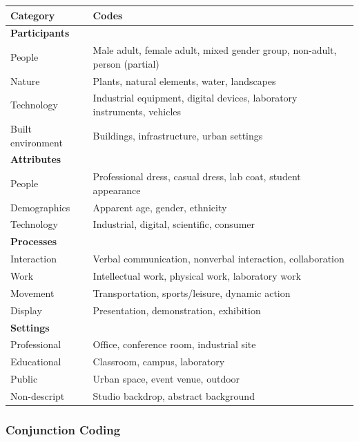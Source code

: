 \documentclass[../main.tex]{subfiles}
\begin{document}
\begin{center}
\small
\begin{tabular}{lp{8cm}}
\toprule
\textbf{Category} & \textbf{Codes} \\
\midrule
\textbf{Participants} & \\
\quad People & Male adult, female adult, mixed gender group, non-adult, person (partial) \\
\quad Nature & Plants, natural elements, water, landscapes \\
\quad Technology & Industrial equipment, digital devices, laboratory instruments, vehicles \\
\quad Built environment & Buildings, infrastructure, urban settings \\
\midrule
\textbf{Attributes} & \\
\quad People & Professional dress, casual dress, lab coat, student appearance \\
\quad Demographics & Apparent age, gender, ethnicity \\
\quad Technology & Industrial, digital, scientific, consumer \\
\midrule
\textbf{Processes} & \\
\quad Interaction & Verbal communication, nonverbal interaction, collaboration \\
\quad Work & Intellectual work, physical work, laboratory work \\
\quad Movement & Transportation, sports/leisure, dynamic action \\
\quad Display & Presentation, demonstration, exhibition \\
\midrule
\textbf{Settings} & \\
\quad Professional & Office, conference room, industrial site \\
\quad Educational & Classroom, campus, laboratory \\
\quad Public & Urban space, event venue, outdoor \\
\quad Non-descript & Studio backdrop, abstract background \\
\bottomrule
\end{tabular}
\end{center}

\subsubsection{Conjunction Coding}
\end{document}

